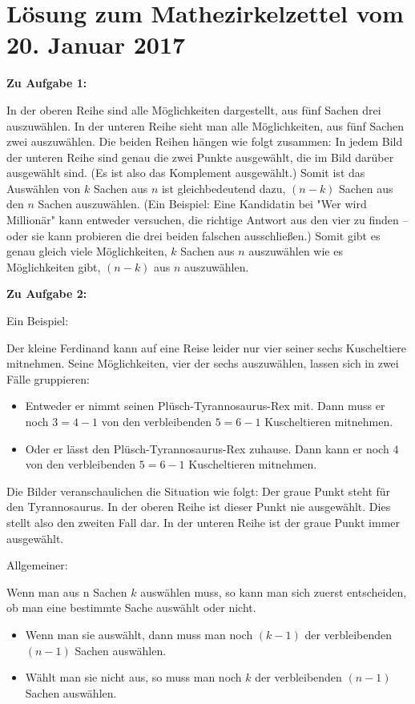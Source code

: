 \documentclass{article}
\begin{document}
\section{Lösung zum Mathezirkelzettel vom 20. Januar 2017}

\textbf{Zu Aufgabe 1:}

In der oberen Reihe sind alle Möglichkeiten dargestellt, aus fünf Sachen drei auszuwählen. In der unteren Reihe sieht man alle Möglichkeiten, aus fünf Sachen zwei auszuwählen. Die beiden Reihen hängen wie folgt zusammen: In jedem Bild der unteren Reihe sind genau die zwei Punkte ausgewählt, die im Bild darüber ausgewählt sind. (Es ist also das Komplement ausgewählt.) Somit ist das Auswählen von $k$ Sachen aus $n$ ist gleichbedeutend dazu, $(n-k)$ Sachen aus den $n$ Sachen auszuwählen. (Ein Beispiel: Eine Kandidatin bei "Wer wird Millionär" kann entweder versuchen, die richtige Antwort aus den vier zu finden -- oder sie kann probieren die drei beiden falschen ausschließen.) Somit gibt es genau gleich viele Möglichkeiten, $k$ Sachen aus $n$ auszuwählen wie es Möglichkeiten gibt, $(n-k)$ aus $n$ auszuwählen.


\textbf{Zu Aufgabe 2:}

Ein Beispiel:

Der kleine Ferdinand kann auf eine Reise leider nur vier seiner sechs Kuscheltiere mitnehmen. Seine Möglichkeiten, vier der sechs auszuwählen, lassen sich in zwei Fälle gruppieren:

\begin{itemize}
  \item Entweder er nimmt seinen Plüsch-Tyrannosaurus-Rex mit. Dann muss er noch $3 = 4-1$ von den verbleibenden $5 = 6-1$ Kuscheltieren mitnehmen.
  \item Oder er lässt den Plüsch-Tyrannosaurus-Rex zuhause. Dann kann er noch $4$ von den verbleibenden $5 = 6-1$ Kuscheltieren mitnehmen.
\end{itemize}

Die Bilder veranschaulichen die Situation wie folgt: Der graue Punkt steht für den Tyrannosaurus. In der oberen Reihe ist dieser Punkt nie ausgewählt. Dies stellt also den zweiten Fall dar. In der unteren Reihe ist der graue Punkt immer ausgewählt.

Allgemeiner:

Wenn man aus n Sachen $k$ auswählen muss, so kann man sich zuerst entscheiden, ob man eine bestimmte Sache auswählt oder nicht.

\begin{itemize}
  \item Wenn man sie auswählt, dann muss man noch $(k-1)$ der verbleibenden $(n-1)$ Sachen auswählen.
  \item Wählt man sie nicht aus, so muss man noch $k$ der verbleibenden $(n-1)$ Sachen auswählen.
\end{itemize}
\end{document}

